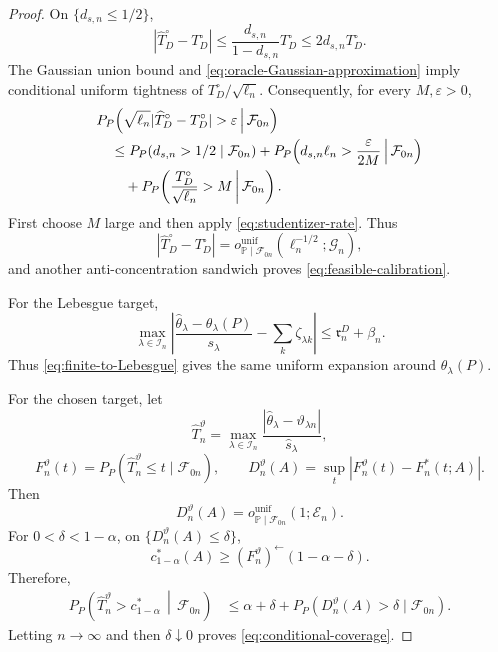 \documentclass[11pt]{article}
\theoremstyle{definition}
\newcommand{\1}{\mathbf 1}\newcommand{\op}{\operatorname}
\begin{document}
\begin{proof}
On $\{d_{s,n}\le1/2\}$,
\begin{equation}
|\widehat T_D^\circ-T_D^\circ|
\le
\frac{d_{s,n}}{1-d_{s,n}}T_D^\circ
\le2d_{s,n}T_D^\circ.
\label{eq:studentizer-difference}
\end{equation}
The Gaussian union bound and
\eqref{eq:oracle-Gaussian-approximation} imply conditional uniform
tightness of $T_D^\circ/\sqrt{\ell_n}$. Consequently, for every
$M,\varepsilon>0$,
\begin{align}
&P_P\!\left(
\sqrt{\ell_n}
|\widehat T_D^\circ-T_D^\circ|>\varepsilon
\,\middle|\,
\mathcal F_{0n}
\right)
\notag\\
&\quad\le
P_P(d_{s,n}>1/2\mid\mathcal F_{0n})
+
P_P\!\left(
d_{s,n}\ell_n>\frac{\varepsilon}{2M}
\,\middle|\,
\mathcal F_{0n}
\right)
\notag\\
&\qquad+
P_P\!\left(
\frac{T_D^\circ}{\sqrt{\ell_n}}>M
\,\middle|\,
\mathcal F_{0n}
\right).
\label{eq:studentizer-product-bound}
\end{align}
First choose $M$ large and then apply
\eqref{eq:studentizer-rate}. Thus
\[
|\widehat T_D^\circ-T_D^\circ|
=
o_{\mathbb P\mid\mathcal F_{0n}}^{\mathrm{unif}}
(\ell_n^{-1/2};\mathcal G_n),
\]
and another anti-concentration sandwich proves
\eqref{eq:feasible-calibration}.

For the Lebesgue target,
\[
\max_{\lambda\in\mathcal I_n}
\left|
\frac{\widehat\theta_\lambda-\theta_\lambda(P)}{s_\lambda}
-
\sum_k\zeta_{\lambda k}
\right|
\le
\mathfrak r_n^D+\beta_n.
\]
Thus \eqref{eq:finite-to-Lebesgue} gives the same uniform expansion
around $\theta_\lambda(P)$.

For the chosen target, let
\[
\widehat T_n^\vartheta
=
\max_{\lambda\in\mathcal I_n}
\frac{
|\widehat\theta_\lambda-\vartheta_{\lambda n}|
}{
\widehat s_\lambda
},
\]
\[
F_n^\vartheta(t)
=
P_P(\widehat T_n^\vartheta\le t\mid\mathcal F_{0n}),
\qquad
D_n^\vartheta(A)
=
\sup_t|F_n^\vartheta(t)-F_n^*(t;A)|.
\]
Then
\[
D_n^\vartheta(A)
=
o_{\mathbb P\mid\mathcal F_{0n}}^{\mathrm{unif}}
(1;\mathcal E_n).
\]
For $0<\delta<1-\alpha$, on
$\{D_n^\vartheta(A)\le\delta\}$,
\[
c_{1-\alpha}^*(A)
\ge
(F_n^\vartheta)^{\leftarrow}(1-\alpha-\delta).
\]
Therefore,
\begin{align}
P_P\!\left(
\widehat T_n^\vartheta>c_{1-\alpha}^*
\,\middle|\,
\mathcal F_{0n}
\right)
&\le
\alpha+\delta
+
P_P(D_n^\vartheta(A)>\delta\mid\mathcal F_{0n}).
\label{eq:quantile-transfer}
\end{align}
Letting $n\to\infty$ and then $\delta\downarrow0$ proves
\eqref{eq:conditional-coverage}.


\end{proof}
\end{document}
